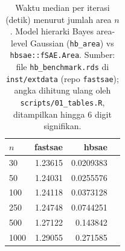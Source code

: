 \begin{table}[htbp]
\centering
\caption{Waktu median per iterasi (detik) menurut jumlah area $n$. Model hierarki Bayes area-level Gaussian (\texttt{hb\_area}) vs \texttt{hbsae::fSAE.Area}. Sumber: file \texttt{hb\_benchmark.rds} di \texttt{inst/extdata} (repo \texttt{fastsae}); angka dihitung ulang oleh \texttt{scripts/01\_tables.R}, ditampilkan hingga 6 digit signifikan.}
\label{tab:time-hb}
\small
\begin{tabular}{lrrr}
\toprule
$n$ & fastsae & hbsae \\
\midrule
30 & 1.23615 & 0.0209383 \\
50 & 1.24031 & 0.0255576 \\
100 & 1.24118 & 0.0373128 \\
250 & 1.24748 & 0.0744251 \\
500 & 1.27122 & 0.143842 \\
1000 & 1.29055 & 0.271585 \\
\bottomrule
\end{tabular}
\end{table}

